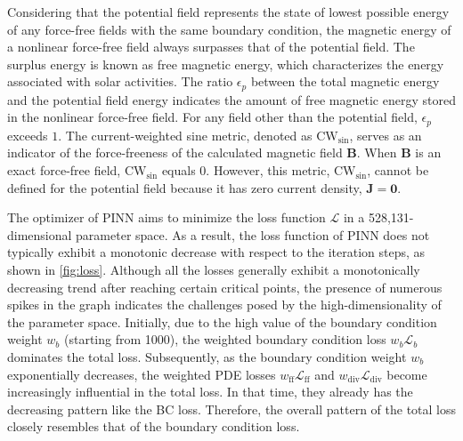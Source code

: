 Considering that the potential field represents the state of lowest possible energy of any force-free fields with the same boundary condition, the magnetic energy of a nonlinear force-free field always surpasses that of the potential field. The surplus energy is known as free magnetic energy, which characterizes the energy associated with solar activities. The ratio $\epsilon_p$ between the total magnetic energy and the potential field energy indicates the amount of free magnetic energy stored in the nonlinear force-free field. For any field other than the potential field, $\epsilon_p$ exceeds $1$. The current-weighted sine metric, denoted as $\text{CW}_\text{sin}$, serves as an indicator of the force-freeness of the calculated magnetic field $\mathbf{B}$. When $\mathbf{B}$ is an exact force-free field, $\text{CW}_\text{sin}$ equals $0$. However, this metric, $\text{CW}_\text{sin}$, cannot be defined for the potential field because it has zero current density, $\mathbf{J}=\mathbf{0}$.


The optimizer of PINN aims to minimize the loss function $\mathcal{L}$ in a 528,131-dimensional parameter space. As a result, the loss function of PINN does not typically exhibit a monotonic decrease with respect to the iteration steps, as shown in \cref{fig:loss}. Although all the losses generally exhibit a monotonically decreasing trend after reaching certain critical points, the presence of numerous spikes in the graph indicates the challenges posed by the high-dimensionality of the parameter space. Initially, due to the high value of the boundary condition weight $w_b$ (starting from 1000), the weighted boundary condition loss $w_b\mathcal{L}_b$ dominates the total loss. Subsequently, as the boundary condition weight $w_b$ exponentially decreases, the weighted PDE losses $w_\text{ff}\mathcal{L}_\text{ff}$ and $w_\text{div}\mathcal{L}_\text{div}$ become increasingly influential in the total loss. In that time, they already has the decreasing pattern like the BC loss. Therefore, the overall pattern of the total loss closely resembles that of the boundary condition loss. 

